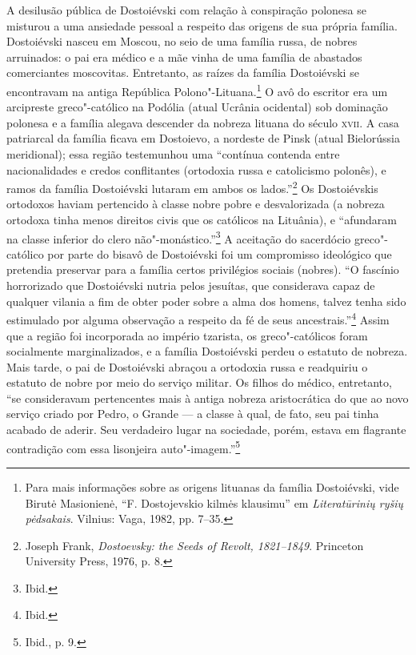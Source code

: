 A desilusão pública de Dostoiévski com relação à conspiração polonesa se
misturou a uma ansiedade pessoal a respeito das origens de sua própria
família. Dostoiévski nasceu em Moscou, no seio de uma família russa, de
nobres arruinados: o pai era médico e a mãe vinha de uma família de
abastados comerciantes moscovitas. Entretanto, as raízes da família
Dostoiévski se encontravam na antiga República Polono"-Lituana.\footnote{Para mais informações sobre as origens lituanas da família Dostoiévski, vide Birutė Masionienė, ``F. Dostojevskio kilmės klausimu'' em \textit{Literatūrinių ryšių pėdsakais}. Vilnius: Vaga, 1982, pp. 7--35.} O avô do escritor era um arcipreste greco"-católico na Podólia (atual
Ucrânia ocidental) sob dominação polonesa e a família alegava descender
da nobreza lituana do século \textsc{xvii}. A casa patriarcal da família ficava em
Dostoievo, a nordeste de Pinsk (atual Bielorússia meridional); essa
região testemunhou uma ``contínua contenda entre nacionalidades e credos
conflitantes (ortodoxia russa e catolicismo polonês), e ramos da família
Dostoiévski lutaram em ambos os lados.''\footnote{Joseph Frank, \textit{Dostoevsky: the Seeds of Revolt, 1821--1849}. Princeton University Press, 1976, p. 8.} Os Dostoiévskis ortodoxos haviam pertencido à classe nobre pobre e desvalorizada (a nobreza ortodoxa
tinha menos direitos civis que os católicos na Lituânia), e ``afundaram
na classe inferior do clero não"-monástico.''\footnote{Ibid.} A aceitação
do sacerdócio greco"-católico por parte do bisavô de Dostoiévski foi um
compromisso ideológico que pretendia preservar para a família certos
privilégios sociais (nobres). ``O fascínio horrorizado que Dostoiévski
nutria pelos jesuítas, que considerava capaz de qualquer vilania a fim
de obter poder sobre a alma dos homens, talvez tenha sido estimulado por
alguma observação a respeito da fé de seus ancestrais.''\footnote{Ibid.}
Assim que a região foi incorporada ao império tzarista, os
greco"-católicos foram socialmente marginalizados, e a família
Dostoiévski perdeu o estatuto de nobreza. Mais tarde, o pai de
Dostoiévski abraçou a ortodoxia russa e readquiriu o estatuto de nobre
por meio do serviço militar. Os filhos do médico, entretanto, ``se
consideravam pertencentes mais à antiga nobreza aristocrática do que ao
novo serviço criado por Pedro, o Grande --- a classe à qual, de fato, seu
pai tinha acabado de aderir. Seu verdadeiro lugar na sociedade, porém,
estava em flagrante contradição com essa lisonjeira
auto"-imagem.''\footnote{Ibid., p. 9.}

